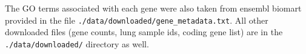 The GO terms associated with each gene were also taken from ensembl biomart provided in the file \verb|./data/downloaded/gene_metadata.txt|.
All other downloaded files (gene counts, lung sample ids, coding gene list) are in the \verb|./data/downloaded/| directory as well.


